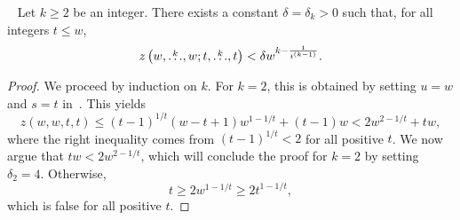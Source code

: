 \begin{lemma}~\label{lm:erdos64-quant}
    Let $k \geq 2$ be an integer.
    There exists a constant $\delta = \delta_k > 0$
    such that, for all integers $t \leq w$,
    \[
        z\left(w, \overset{k}{\dots}, w; t, \overset{k}{\dots}, t\right) < \delta w^{k - \frac{1}{t^{(k-1)}}}.
    \]
    \begin{proof}
        We proceed by induction on $k$.
        For $k=2$, this is obtained by setting $u = w$ and $s = t$ in~.
        This yields
        \[
            z(w, w, t, t)
            \leq (t-1)^{1/t}(w-t+1)w^{1-1/t} + (t-1)w
            < 2w^{2 - 1/t} + tw,
        \]
        where the right inequality comes from $(t-1)^{1/t} < 2$ for all positive $t$.
        We now argue that $tw < 2 w^{2-1/t}$,
        which will conclude the proof for $k=2$ by setting $\delta_2 = 4$.
        Otherwise,
        \[
            t \geq 2 w^{1 - 1/t} \geq 2 t^{1 - 1/t},
        \]
        which is false for all positive $t$.


\end{proof}
\end{lemma}
